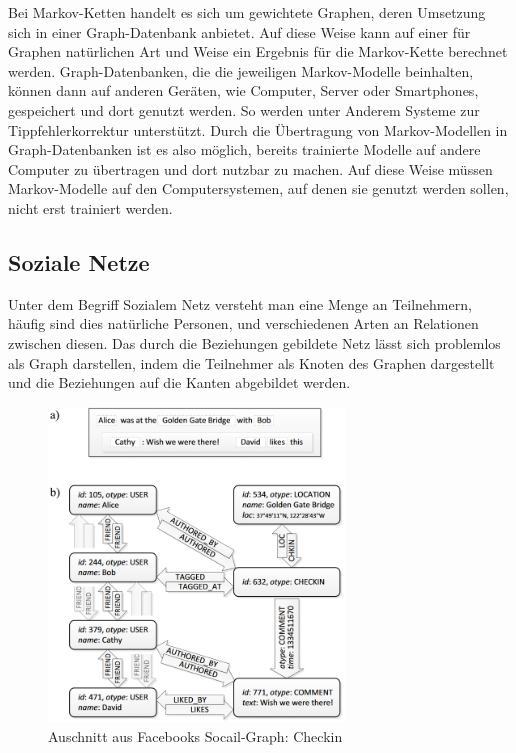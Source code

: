 Bei Markov-Ketten handelt es sich um gewichtete Graphen, deren Umsetzung sich in einer Graph-Datenbank anbietet. Auf diese Weise kann auf einer für Graphen natürlichen Art und Weise ein Ergebnis für die Markov-Kette berechnet werden. Graph-Datenbanken, die die jeweiligen Markov-Modelle beinhalten, können dann auf anderen Geräten, wie Computer, Server oder Smartphones, gespeichert und dort genutzt werden. So werden unter Anderem Systeme zur Tippfehlerkorrektur unterstützt. Durch die Übertragung von Markov-Modellen in Graph-Datenbanken ist es also möglich, bereits trainierte Modelle auf andere Computer zu übertragen und dort nutzbar zu machen. Auf diese Weise müssen Markov-Modelle auf den Computersystemen, auf denen sie genutzt werden sollen, nicht erst trainiert werden.

\subsection{Soziale Netze}
Unter dem Begriff Sozialem Netz versteht man eine Menge an Teilnehmern, häufig sind dies natürliche Personen, und verschiedenen Arten an Relationen zwischen diesen. Das durch die Beziehungen gebildete Netz lässt sich problemlos als Graph darstellen, indem die Teilnehmer als Knoten des Graphen dargestellt und die Beziehungen auf die Kanten abgebildet werden.

\begin{figure}[h]
	\caption{Auschnitt aus Facebooks Socail-Graph: Checkin \cite{facebookTao}}
	\label{fig:fbCheckin}
	\centering
	\includegraphics[width=0.7\textwidth]{images/facebook_checkin.png}
\end{figure}

